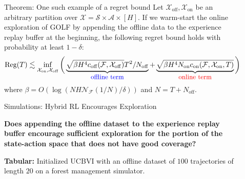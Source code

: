 \documentclass[final]{beamer}
\newcommand{\off}{\operatorname{off}}
\newcommand{\on}{\operatorname{on}}
\newcommand{\gX}{\mathcal{X}}
\newcommand{\gA}{\mathcal{A}}
\newcommand{\gS}{\mathcal{S}}
\newcommand{\gF}{\mathcal{F}}
\newcommand{\Reg}{\text{Reg}}
\newlength{\sepwidth}
\newlength{\colwidth}
\newcommand{\separatorcolumn}{\begin{column}{\sepwidth}\end{column}}
\begin{document}
\begin{frame}[t]
\begin{columns}[t]
\begin{column}{\colwidth}
\end{column}

\separatorcolumn

\begin{column}{\colwidth}

    \begin{alertblock}{Theorem: One such example of a regret bound}
\label{thm:regret_bound}
Let $\gX_{\off}, \gX_{\on}$ be an arbitrary partition over $\gX = \gS \times \gA \times [H]$. 
If we warm-start the online exploration of GOLF \cite{jin2021bellmaneluder, xie2022role} by appending the offline data to the experience replay buffer at the beginning, the following regret bound holds with probability at least $1-\delta$: 
\begin{align*}
    \Reg(T)
    \lesssim \inf_{\gX_{\on}, \gX_{\off}} \bigg(\underbrace{\sqrt{\beta H^4 c_{\off}(\gF, \gX_{\off})} T^2/N_{\off}}_{\textcolor{blue}{\text{\small{offline term}}}} + \underbrace{\sqrt{\beta H^4 N_{\on} c_{\on}(\gF, \gX_{\on}, T)}}_{\textcolor{red}{\text{\small{online term}}}}\bigg),
\end{align*} 
where 
$\beta = O(\log (N H \mathcal{N}_{\mathcal{F}}(1/N) / \delta))$ and $N = T + N_{\off}$.
\end{alertblock}





  \begin{exampleblock}{Simulations: Hybrid RL Encourages Exploration}

  \textbf{Does appending the offline dataset to the experience replay buffer encourage sufficient exploration for the portion of the state-action space that does not have good coverage?}

  \textbf{Tabular:} Initialized UCBVI \cite{azar2017minimax} with an offline dataset of $100$ trajectories of length $20$ on a forest management simulator. 


\end{exampleblock}
\end{column}
\end{columns}
\end{frame}
\end{document}
